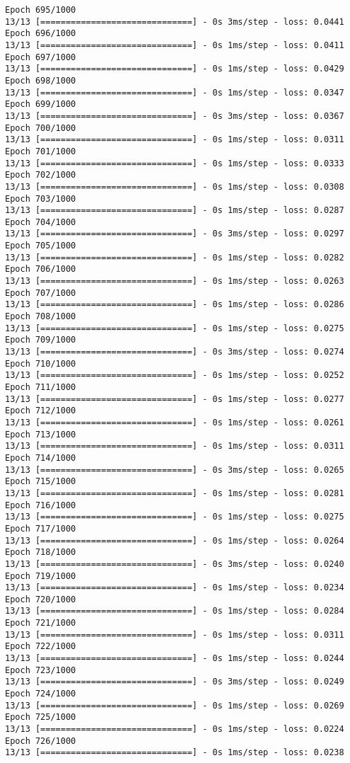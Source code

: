 \documentclass[11pt]{article}
\begin{document}
\begin{Verbatim}[commandchars=\\\{\}]
Epoch 695/1000
13/13 [==============================] - 0s 3ms/step - loss: 0.0441
Epoch 696/1000
13/13 [==============================] - 0s 1ms/step - loss: 0.0411
Epoch 697/1000
13/13 [==============================] - 0s 1ms/step - loss: 0.0429
Epoch 698/1000
13/13 [==============================] - 0s 1ms/step - loss: 0.0347
Epoch 699/1000
13/13 [==============================] - 0s 3ms/step - loss: 0.0367
Epoch 700/1000
13/13 [==============================] - 0s 1ms/step - loss: 0.0311
Epoch 701/1000
13/13 [==============================] - 0s 1ms/step - loss: 0.0333
Epoch 702/1000
13/13 [==============================] - 0s 1ms/step - loss: 0.0308
Epoch 703/1000
13/13 [==============================] - 0s 1ms/step - loss: 0.0287
Epoch 704/1000
13/13 [==============================] - 0s 3ms/step - loss: 0.0297
Epoch 705/1000
13/13 [==============================] - 0s 1ms/step - loss: 0.0282
Epoch 706/1000
13/13 [==============================] - 0s 1ms/step - loss: 0.0263
Epoch 707/1000
13/13 [==============================] - 0s 1ms/step - loss: 0.0286
Epoch 708/1000
13/13 [==============================] - 0s 1ms/step - loss: 0.0275
Epoch 709/1000
13/13 [==============================] - 0s 3ms/step - loss: 0.0274
Epoch 710/1000
13/13 [==============================] - 0s 1ms/step - loss: 0.0252
Epoch 711/1000
13/13 [==============================] - 0s 1ms/step - loss: 0.0277
Epoch 712/1000
13/13 [==============================] - 0s 1ms/step - loss: 0.0261
Epoch 713/1000
13/13 [==============================] - 0s 1ms/step - loss: 0.0311
Epoch 714/1000
13/13 [==============================] - 0s 3ms/step - loss: 0.0265
Epoch 715/1000
13/13 [==============================] - 0s 1ms/step - loss: 0.0281
Epoch 716/1000
13/13 [==============================] - 0s 1ms/step - loss: 0.0275
Epoch 717/1000
13/13 [==============================] - 0s 1ms/step - loss: 0.0264
Epoch 718/1000
13/13 [==============================] - 0s 3ms/step - loss: 0.0240
Epoch 719/1000
13/13 [==============================] - 0s 1ms/step - loss: 0.0234
Epoch 720/1000
13/13 [==============================] - 0s 1ms/step - loss: 0.0284
Epoch 721/1000
13/13 [==============================] - 0s 1ms/step - loss: 0.0311
Epoch 722/1000
13/13 [==============================] - 0s 1ms/step - loss: 0.0244
Epoch 723/1000
13/13 [==============================] - 0s 3ms/step - loss: 0.0249
Epoch 724/1000
13/13 [==============================] - 0s 1ms/step - loss: 0.0269
Epoch 725/1000
13/13 [==============================] - 0s 1ms/step - loss: 0.0224
Epoch 726/1000
13/13 [==============================] - 0s 1ms/step - loss: 0.0238

\end{Verbatim}
\end{document}
